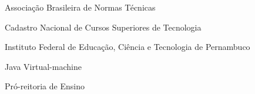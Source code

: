 \begin{siglas}
  \item[ABNT] Associação Brasileira de Normas Técnicas
  \item[CNCST] Cadastro Nacional de Cursos Superiores de Tecnologia  
  \item[IFPE] Instituto Federal de Educação, Ciência e Tecnologia de Pernambuco
  \item[JVM] Java Virtual-machine
  \item[PRODEN] Pró-reitoria de Ensino
\end{siglas}